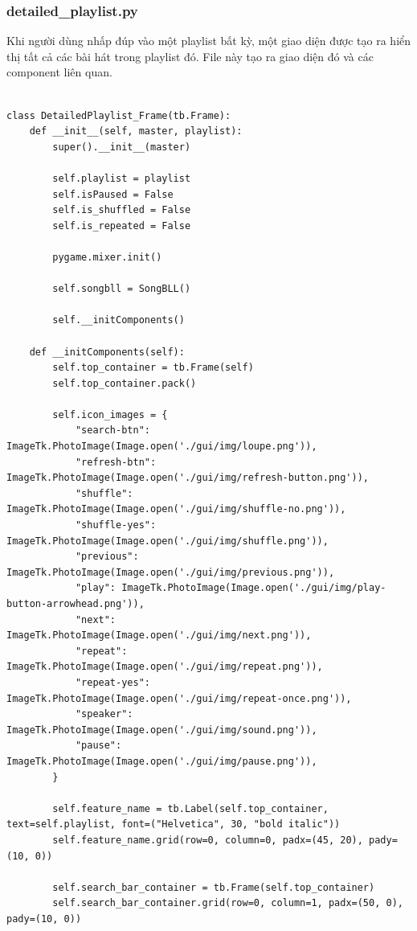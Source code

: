 \documentclass[a4paper]{article}
\begin{document}
\subsubsection{detailed\_playlist.py}
Khi người dùng nhấp đúp vào một playlist bất kỳ, một giao diện được tạo ra hiển thị tất cả các bài hát trong playlist đó. File này tạo ra giao diện đó và các component liên quan.
\begin{mdframed}[hidealllines=true,backgroundcolor=magenta!10]
\begin{lstlisting}

class DetailedPlaylist_Frame(tb.Frame):
    def __init__(self, master, playlist):
        super().__init__(master)

        self.playlist = playlist
        self.isPaused = False
        self.is_shuffled = False
        self.is_repeated = False

        pygame.mixer.init()

        self.songbll = SongBLL()

        self.__initComponents()

    def __initComponents(self):
        self.top_container = tb.Frame(self)
        self.top_container.pack()

        self.icon_images = {
            "search-btn": ImageTk.PhotoImage(Image.open('./gui/img/loupe.png')),
            "refresh-btn": ImageTk.PhotoImage(Image.open('./gui/img/refresh-button.png')),
            "shuffle": ImageTk.PhotoImage(Image.open('./gui/img/shuffle-no.png')),
            "shuffle-yes": ImageTk.PhotoImage(Image.open('./gui/img/shuffle.png')),
            "previous": ImageTk.PhotoImage(Image.open('./gui/img/previous.png')),
            "play": ImageTk.PhotoImage(Image.open('./gui/img/play-button-arrowhead.png')),
            "next": ImageTk.PhotoImage(Image.open('./gui/img/next.png')),
            "repeat": ImageTk.PhotoImage(Image.open('./gui/img/repeat.png')),
            "repeat-yes": ImageTk.PhotoImage(Image.open('./gui/img/repeat-once.png')),
            "speaker": ImageTk.PhotoImage(Image.open('./gui/img/sound.png')),
            "pause": ImageTk.PhotoImage(Image.open('./gui/img/pause.png')),
        }

        self.feature_name = tb.Label(self.top_container, text=self.playlist, font=("Helvetica", 30, "bold italic"))
        self.feature_name.grid(row=0, column=0, padx=(45, 20), pady=(10, 0))

        self.search_bar_container = tb.Frame(self.top_container)
        self.search_bar_container.grid(row=0, column=1, padx=(50, 0), pady=(10, 0))


\end{lstlisting}
\end{mdframed}
\end{document}
